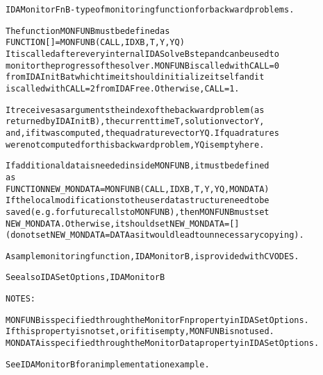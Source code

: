 \begin{alltt}
IDAMonitorFnB - type of monitoring function for backward problems.

   The function MONFUNB must be defined as
       FUNCTION [] = MONFUNB(CALL, IDXB, T, Y, YQ)
   It is called after every internal IDASolveB step and can be used to
   monitor the progress of the solver. MONFUNB is called with CALL=0
   from IDAInitB at which time it should initialize itself and it
   is called with CALL=2 from IDAFree. Otherwise, CALL=1.

   It receives as arguments the index of the backward problem (as
   returned by IDAInitB), the current time T, solution vector Y,
   and, if it was computed, the quadrature vector YQ. If quadratures
   were not computed for this backward problem, YQ is empty here.

   If additional data is needed inside MONFUNB, it must be defined
   as
      FUNCTION NEW_MONDATA = MONFUNB(CALL, IDXB, T, Y, YQ, MONDATA)
   If the local modifications to the user data structure need to be 
   saved (e.g. for future calls to MONFUNB), then MONFUNB must set
   NEW_MONDATA. Otherwise, it should set NEW_MONDATA=[] 
   (do not set NEW_MONDATA = DATA as it would lead to unnecessary copying).

   A sample monitoring function, IDAMonitorB, is provided with CVODES.

   See also IDASetOptions, IDAMonitorB

   NOTES:

   MONFUNB is specified through the MonitorFn property in IDASetOptions.
   If this property is not set, or if it is empty, MONFUNB is not used.
   MONDATA is specified through the MonitorData property in IDASetOptions.

   See IDAMonitorB for an implementation example.
\end{alltt}






\vspace{0.1in}